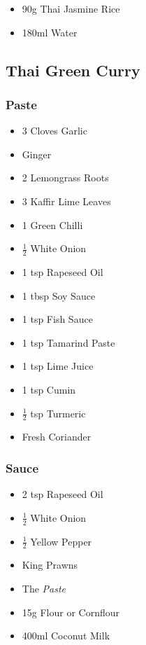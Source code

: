 \documentclass[11pt, english]{article}
\begin{document}
	\begin{itemize}
        \setlength\itemsep{0cm}
                \item 90g Thai Jasmine Rice
		\item 180ml Water
        \end{itemize}

\newpage

	\subsection{Thai Green Curry}

		\subsubsection*{Paste}

	\begin{itemize}
        \setlength\itemsep{0cm}
                \item 3 Cloves Garlic
		\item Ginger
		\item 2 Lemongrass Roots
		\item 3 Kaffir Lime Leaves
		\item 1 Green Chilli
		\item $\frac{1}{2}$ White Onion
		\item 1 tsp Rapeseed Oil
		\item 1 tbsp Soy Sauce
		\item 1 tsp Fish Sauce
		\item 1 tsp Tamarind Paste
		\item 1 tsp Lime Juice
		\item 1 tsp Cumin
		\item $\frac{1}{2}$ tsp Turmeric
		\item Fresh Coriander
        \end{itemize}

		\subsubsection*{Sauce}

	\begin{itemize}
        \setlength\itemsep{0cm}
                \item 2 tsp Rapeseed Oil
		\item $\frac{1}{2}$ White Onion
		\item $\frac{1}{2}$ Yellow Pepper
		\item King Prawns
		\item The \textit{Paste}
		\item 15g Flour or Cornflour
		\item 400ml Coconut Milk
        \end{itemize}
\end{document}
